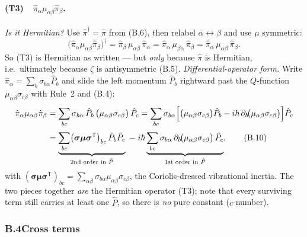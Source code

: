 \paragraph{(T3)\ \ $\hat\pi_\alpha\mu_{\alpha\beta}\hat\pi_\beta$.}
\emph{Is it Hermitian?} Use $\hat\pi^{\dagger}=\hat\pi$ from (B.6), then relabel $\alpha\leftrightarrow\beta$ and use $\mu$ symmetric:
\begin{equation*}
\bigl(\hat\pi_\alpha\mu_{\alpha\beta}\hat\pi_\beta\bigr)^{\dagger}
=\hat\pi_\beta\,\mu_{\alpha\beta}\,\hat\pi_\alpha
=\hat\pi_\alpha\,\mu_{\beta\alpha}\,\hat\pi_\beta
=\hat\pi_\alpha\,\mu_{\alpha\beta}\,\hat\pi_\beta .
\end{equation*}
So (T3) is Hermitian as written --- but \emph{only} because $\hat\pi$ is Hermitian, i.e.\ ultimately because $\zeta$ is antisymmetric (B.5). \emph{Differential-operator form.} Write $\hat\pi_\alpha=\sum_b\sigma_{b\alpha}\hat P_b$ and slide the left momentum $\hat P_b$ rightward past the $Q$-function $\mu_{\alpha\beta}\sigma_{c\beta}$ with Rule~2 and (B.4):
\begin{align}
\hat\pi_\alpha\mu_{\alpha\beta}\hat\pi_\beta
&=\sum_{bc}\sigma_{b\alpha}\,\hat P_b\,\bigl(\mu_{\alpha\beta}\sigma_{c\beta}\bigr)\,\hat P_c
=\sum_{bc}\sigma_{b\alpha}\Bigl[\bigl(\mu_{\alpha\beta}\sigma_{c\beta}\bigr)\hat P_b-i\hbar\,\partial_b\!\bigl(\mu_{\alpha\beta}\sigma_{c\beta}\bigr)\Bigr]\hat P_c\nonumber\\[2pt]
&=\underbrace{\sum_{bc}\bigl(\boldsymbol\sigma\boldsymbol\mu\boldsymbol\sigma^{\mathsf T}\bigr)_{bc}\,\hat P_b\hat P_c}_{\text{2nd order in }\hat P}
\;-\;i\hbar\underbrace{\sum_{bc}\sigma_{b\alpha}\,\partial_b\!\bigl(\mu_{\alpha\beta}\sigma_{c\beta}\bigr)\,\hat P_c}_{\text{1st order in }\hat P}, \tag{B.10}
\end{align}
with $(\boldsymbol\sigma\boldsymbol\mu\boldsymbol\sigma^{\mathsf T})_{bc}=\sum_{\alpha\beta}\sigma_{b\alpha}\mu_{\alpha\beta}\sigma_{c\beta}$, the Coriolis-dressed vibrational inertia. The two pieces together \emph{are} the Hermitian operator (T3); note that every surviving term still carries at least one $\hat P$, so there is \emph{no} pure constant ($c$-number).

\subsubsection*{B.4\quad Cross terms}

